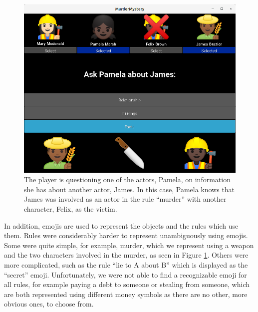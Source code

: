 \begin{figure}
  \includegraphics[width=\columnwidth]{murder_screenshot.png}
  \caption{The player is questioning one of the actors, Pamela, on information she has about another actor, James. In this case, Pamela knows that James was involved as an actor in the rule \enquote{murder} with another character, Felix, as the victim.}
  \label{fig:murder}
\end{figure}

In addition, emojis are used to represent the objects and the rules which use them.
Rules were considerably harder to represent unambiguously using emojis.
Some were quite simple, for example, murder, which we represent using a weapon and the two characters involved in the murder, as seen in Figure \ref{fig:murder}.
Others were more complicated, such as the rule \enquote{lie to A about B} which is displayed as the \enquote{secret} emoji.
Unfortunately, we were not able to find a recognizable emoji for all rules, for example paying a debt to someone or stealing from someone, which are both represented using different money symbols as there are no other, more obvious ones, to choose from.